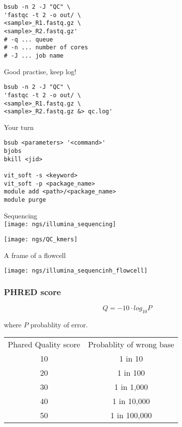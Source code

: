 \documentclass[xcolor=dvipsnames]{beamer}
\begin{document}
\begin{frame}[fragile]
\LARGE
\begin{verbatim}
bsub -n 2 -J "QC" \
'fastqc -t 2 -o out/ \
<sample>_R1.fastq.gz \
<sample>_R2.fastq.gz'
# -q ... queue
# -n ... number of cores
# -J ... job name
\end{verbatim}
\end{frame}

\begin{frame}[fragile]
Good practise, keep log!
\LARGE
\begin{verbatim}
bsub -n 2 -J "QC" \
'fastqc -t 2 -o out/ \
<sample>_R1.fastq.gz \
<sample>_R2.fastq.gz &> qc.log'
\end{verbatim}
\end{frame}

\begin{frame}[fragile]
	\begin{center}
		\Huge
		Your turn
	\end{center}
\begin{verbatim}
bsub <parameters> '<command>'
bjobs
bkill <jid>

vit_soft -s <keyword>
vit_soft -p <package_name>
module add <path>/<package_name>
module purge
\end{verbatim}
\end{frame}

\begin{frame}
	\begin{center}
		\Huge
		Sequencing\\
		\vspace{1cm}
		\texttt{[image: ngs/illumina\_sequencing]}
	\end{center}
\end{frame}

\begin{frame}
	\texttt{[image: ngs/QC\_kmers]}
\end{frame}

\begin{frame}
	\Huge
	A frame of a flowcell \\
	\begin{center}
		\texttt{[image: ngs/illumina\_sequencinh\_flowcell]}
	\end{center}
\end{frame}

\begin{frame}
	\frametitle{PHRED score}
	$$ Q = -10 \cdot log_{10}P $$

	\vspace{0.5cm}
	\large
	where $P$ probablity of error.

	\vspace{1cm}
	\begin{tabular}{c c}
	Phared Quality score & Probablity of wrong base \\
	10 & 1 in 10  \\
	20 & 1 in 100  \\
	30 & 1 in 1,000 \\
	40 & 1 in 10,000 \\
	50 & 1 in 100,000 \\
	\end{tabular}
\end{frame}
\end{document}
